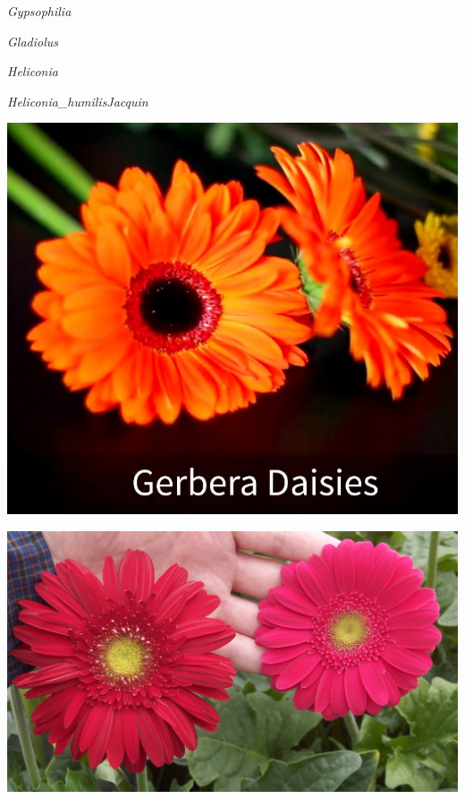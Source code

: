 \documentclass{article}
\begin{document}
\noindent   
\vfill
\centerline{{\Large\emph{Gypsophilia}}}
\vfill
\newpage

\noindent   
\vfill
\centerline{{\Large\emph{Gladiolus}}}
\vfill
\newpage

\noindent   
\vfill
\centerline{{\Large\emph{Heliconia}}}
\vfill
\newpage

\noindent   
\vfill
\centerline{{\Large\emph{Heliconia_humilisJacquin}}}
\vfill
\newpage

\begin{center}
\includegraphics[width=0.9\textheight, angle=90]{../Gerbera_Daisies.jpg}
\end{center}
\newpage

\begin{center}
\includegraphics[width=0.9\textheight, angle=90]{../Gerbera_PassionMaya.jpg}
\end{center}
\newpage
\end{document}
